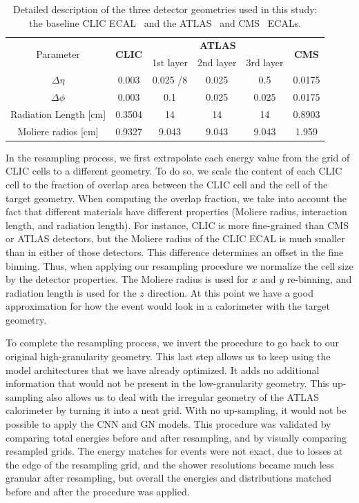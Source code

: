 \begin{table}[htbp]
\centering
\caption{Detailed description of the three detector geometries used in this study: the baseline CLIC ECAL~\cite{CLIC_geometry} and the ATLAS~\cite{Aad:2008zzm} and CMS~\cite{Chatrchyan:2008aa} ECALs.\label{tab:resampling_geometry}}
\begin{tabular}{c|c|ccc|c}
\hline
\multirow{2}{*}{Parameter} & \multirow{2}{*}{\textbf{CLIC}} & \multicolumn{3}{c|}{\textbf{ATLAS}} & \multirow{2}{*}{\textbf{CMS}} \\
            &               & 1st layer & 2nd layer & 3rd layer & \\
\hline
$\Delta \eta$         & 0.003  & 0.025 /8 & 0.025 & 0.5   & 0.0175 \\
$\Delta \phi$         & 0.003  & 0.1      & 0.025 & 0.025 & 0.0175 \\
Radiation Length [cm] & 0.3504 & 14       & 14    & 14    & 0.8903 \\
Moliere radios [cm]   & 0.9327 & 9.043    & 9.043 & 9.043 & 1.959  \\
\hline 
\end{tabular}
\end{table}

In the resampling process, we first extrapolate each energy value from the grid of CLIC cells to a different geometry. To do so, we scale the content of each CLIC cell to the fraction of overlap area between the CLIC cell and the cell of the target geometry. When computing the overlap fraction, we take into account the fact that different materials have different properties (Moliere radius, interaction length, and radiation length). For instance, CLIC is more fine-grained than CMS or ATLAS detectors, but the Moliere radius of the CLIC ECAL is much smaller than in either of those detectors. This difference determines an offset in the fine binning. Thus, when applying our resampling procedure we normalize the cell size by the detector properties. The Moliere radius is used for $x$ and $y$ re-binning, and radiation length is used for the $z$ direction. At this point we have a good approximation for how the event would look in a calorimeter with the target geometry.

To complete the resampling process, we invert the procedure to go back to our original high-granularity geometry. This last step allows us to keep using the model architectures that we have already optimized. It adds no additional information that would not be present in the low-granularity geometry. This up-sampling also allows us to deal with the irregular geometry of the ATLAS calorimeter by turning it into a neat grid. With no up-sampling, it would not be possible to apply the CNN and GN models. This procedure was validated by comparing total energies before and after resampling, and by visually comparing resampled grids. The energy matches for events were not exact, due to losses at the edge of the resampling grid, and the shower resolutions became much less granular after resampling, but overall the energies and distributions matched before and after the procedure was applied.

